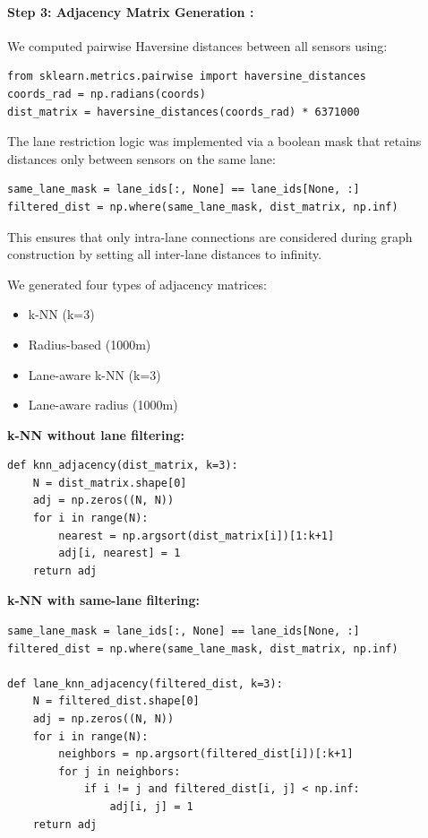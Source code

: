 \documentclass[runningheads]{llncs}
\begin{document}
\paragraph{Step 3: Adjacency Matrix Generation : }
We computed pairwise Haversine distances between all sensors using:

\begin{lstlisting}[style=customPython]
from sklearn.metrics.pairwise import haversine_distances
coords_rad = np.radians(coords)
dist_matrix = haversine_distances(coords_rad) * 6371000
\end{lstlisting}

The lane restriction logic was implemented via a boolean mask that retains distances only between sensors on the same lane:

\begin{lstlisting}[style=customPython]
same_lane_mask = lane_ids[:, None] == lane_ids[None, :]
filtered_dist = np.where(same_lane_mask, dist_matrix, np.inf)
\end{lstlisting}

This ensures that only intra-lane connections are considered during graph construction by setting all inter-lane distances to infinity.

\noindent We generated four types of adjacency matrices:
\begin{itemize}
    \item k-NN (k=3)
    \item Radius-based (1000m)
    \item Lane-aware k-NN (k=3)
    \item Lane-aware radius (1000m)
\end{itemize}

\noindent\textbf{k-NN without lane filtering:}
\begin{lstlisting}[style=customPython]
def knn_adjacency(dist_matrix, k=3):
    N = dist_matrix.shape[0]
    adj = np.zeros((N, N))
    for i in range(N):
        nearest = np.argsort(dist_matrix[i])[1:k+1]
        adj[i, nearest] = 1
    return adj
\end{lstlisting}

\noindent\textbf{k-NN with same-lane filtering:}
\begin{lstlisting}[style=customPython]
same_lane_mask = lane_ids[:, None] == lane_ids[None, :]
filtered_dist = np.where(same_lane_mask, dist_matrix, np.inf)

def lane_knn_adjacency(filtered_dist, k=3):
    N = filtered_dist.shape[0]
    adj = np.zeros((N, N))
    for i in range(N):
        neighbors = np.argsort(filtered_dist[i])[:k+1]
        for j in neighbors:
            if i != j and filtered_dist[i, j] < np.inf:
                adj[i, j] = 1
    return adj
\end{lstlisting}
\end{document}
